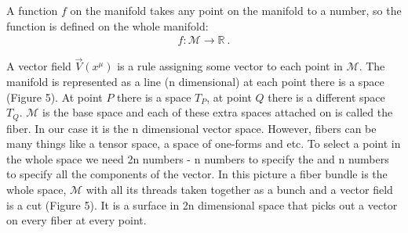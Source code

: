 \documentclass[11pt]{article}
\begin{document}
A function $f$ on the manifold takes any point on the manifold to a number, so the function is defined on the whole manifold:
\begin{align*}
f: \mathcal{M} \rightarrow \mathbb{R} \ .
\end{align*}

A vector field $\vec{V}(x^\mu)$ is a rule assigning some vector to each point in $\mathcal{M}$.
The manifold is represented as a line (n dimensional) at each point there is a space (Figure 5). At point $P$ there is a space $T_P$, at point $Q$ there is a different space $T_Q$. $\mathcal{M}$ is the base space and each of these extra spaces attached on is called the fiber. In our case it is the n dimensional vector space. However, fibers can be many things like a tensor space, a space of one-forms and etc. To select a point in the whole space we need 2n numbers - n numbers to specify the and n numbers to specify all the components of the vector. In this picture a fiber bundle is the whole space, $\mathcal{M}$ with all its threads taken together as a bunch and a vector field is a cut (Figure 5). It is a surface in 2n dimensional space that picks out a vector on every fiber at every point.
\end{document}
